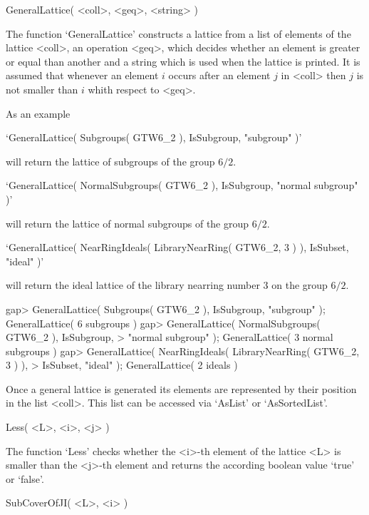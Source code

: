 


\>GeneralLattice( <coll>, <geq>, <string> )

The function `GeneralLattice' constructs a lattice from a list of elements of
the lattice <coll>, an operation <geq>, which decides whether an element is
greater or equal than another and a string which is used when the lattice is
printed. It is assumed that whenever an element $i$ occurs after an element
$j$ in <coll> then $j$ is not smaller than $i$ whith respect to <geq>.

As an example

`GeneralLattice( Subgroups( GTW6_2 ), IsSubgroup, "subgroup" )'

will return the lattice of subgroups of the group $6/2$.

`GeneralLattice( NormalSubgroups( GTW6_2 ), IsSubgroup, "normal subgroup" )'

will return the lattice of normal subgroups of the group $6/2$.

`GeneralLattice( NearRingIdeals( LibraryNearRing( GTW6_2, 3 ) ), IsSubset, "ideal" )'

will return the ideal lattice of the library nearring number 3 on the group
$6/2$.

\beginexample
    gap> GeneralLattice( Subgroups( GTW6_2 ), IsSubgroup, "subgroup" );
    GeneralLattice( 6 subgroups )
    gap> GeneralLattice( NormalSubgroups( GTW6_2 ), IsSubgroup,             
    >       "normal subgroup" );
    GeneralLattice( 3 normal subgroups )
    gap> GeneralLattice( NearRingIdeals( LibraryNearRing( GTW6_2, 3 ) ),    
    >       IsSubset, "ideal" );
    GeneralLattice( 2 ideals )
\endexample

Once a general lattice is generated its elements are represented by their
position in the list <coll>. This list can be accessed via `AsList' or
`AsSortedList'.



\>Less( <L>, <i>, <j> )

The function `Less' checks whether the <i>-th element of the lattice <L>
is smaller than the <j>-th element and returns the according boolean value
`true' or `false'.

\>SubCoverOfJI( <L>, <i> )

